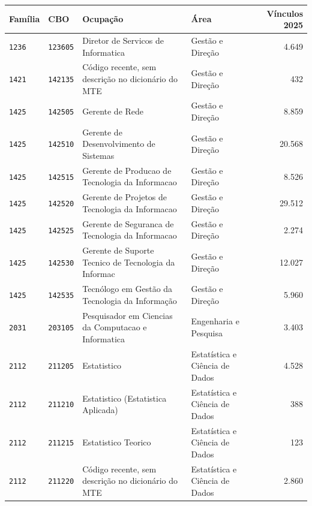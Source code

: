 \begin{quadro}[htbp]
    \centering
    \caption{Códigos CBO do recorte de tecnologia observados no estoque de 2025}
    \label{quadro:cbos}
    \footnotesize
    \renewcommand{\arraystretch}{1.25}
    \begin{tabular}{llp{6.0cm}lr}
        \toprule
        \rowcolor{black!8}
        \textbf{Família} & \textbf{CBO} & \textbf{Ocupação} & \textbf{Área} & \textbf{Vínculos 2025} \\
        \midrule
        \texttt{1236} & \texttt{123605} & Diretor de Servicos de Informatica & Gestão e Direção & 4.649 \\
        \texttt{1421} & \texttt{142135} & Código recente, sem descrição no dicionário do MTE & Gestão e Direção & 432 \\
        \texttt{1425} & \texttt{142505} & Gerente de Rede & Gestão e Direção & 8.859 \\
        \texttt{1425} & \texttt{142510} & Gerente de Desenvolvimento de Sistemas & Gestão e Direção & 20.568 \\
        \texttt{1425} & \texttt{142515} & Gerente de Producao de Tecnologia da Informacao & Gestão e Direção & 8.526 \\
        \texttt{1425} & \texttt{142520} & Gerente de Projetos de Tecnologia da Informacao & Gestão e Direção & 29.512 \\
        \texttt{1425} & \texttt{142525} & Gerente de Seguranca de Tecnologia da Informacao & Gestão e Direção & 2.274 \\
        \texttt{1425} & \texttt{142530} & Gerente de Suporte Tecnico de Tecnologia da Informac & Gestão e Direção & 12.027 \\
        \texttt{1425} & \texttt{142535} & Tecnólogo em Gestão da Tecnologia da Informação & Gestão e Direção & 5.960 \\
        \texttt{2031} & \texttt{203105} & Pesquisador em Ciencias da Computacao e Informatica & Engenharia e Pesquisa & 3.403 \\
        \texttt{2112} & \texttt{211205} & Estatistico & Estatística e Ciência de Dados & 4.528 \\
        \texttt{2112} & \texttt{211210} & Estatistico (Estatistica Aplicada) & Estatística e Ciência de Dados & 388 \\
        \texttt{2112} & \texttt{211215} & Estatistico Teorico & Estatística e Ciência de Dados & 123 \\
        \texttt{2112} & \texttt{211220} & Código recente, sem descrição no dicionário do MTE & Estatística e Ciência de Dados & 2.860 \\

\end{tabular}
\end{quadro}
